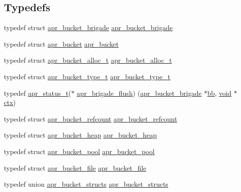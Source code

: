 \subsection*{Typedefs}
\begin{DoxyCompactItemize}
\item 
typedef struct \hyperlink{structapr__bucket__brigade}{apr\+\_\+bucket\+\_\+brigade} \hyperlink{group__APR__Util__Bucket__Brigades_ga9f50254e85c7aad79ca289a0ba069025}{apr\+\_\+bucket\+\_\+brigade}
\item 
typedef struct \hyperlink{structapr__bucket}{apr\+\_\+bucket} \hyperlink{group__APR__Util__Bucket__Brigades_gaa17a456120961b1c5af0525f4900a457}{apr\+\_\+bucket}
\item 
typedef struct \hyperlink{structapr__bucket__alloc__t}{apr\+\_\+bucket\+\_\+alloc\+\_\+t} \hyperlink{group__APR__Util__Bucket__Brigades_ga9a30babfeb6e290db124d8f9b69e49e4}{apr\+\_\+bucket\+\_\+alloc\+\_\+t}
\item 
typedef struct \hyperlink{structapr__bucket__type__t}{apr\+\_\+bucket\+\_\+type\+\_\+t} \hyperlink{group__APR__Util__Bucket__Brigades_ga4a152aaf7d851c81af73b7e84dc1a8a2}{apr\+\_\+bucket\+\_\+type\+\_\+t}
\item 
typedef \hyperlink{group__apr__errno_gaa5105fa83cc322f09382292db8b47593}{apr\+\_\+status\+\_\+t}($\ast$ \hyperlink{group__APR__Util__Bucket__Brigades_gafa0dbcd060e2e432406052e4d7c96204}{apr\+\_\+brigade\+\_\+flush}) (\hyperlink{structapr__bucket__brigade}{apr\+\_\+bucket\+\_\+brigade} $\ast$\hyperlink{group__MOD__PROXY_ga9313a8a2814cff280d5d780c723def3c}{bb}, \hyperlink{group__MOD__ISAPI_gacd6cdbf73df3d9eed42fa493d9b621a6}{void} $\ast$\hyperlink{group__APR__Util__Bucket__Brigades_ga0525238c5b09cb4ac5067ddec654d09c}{ctx})
\item 
typedef struct \hyperlink{structapr__bucket__refcount}{apr\+\_\+bucket\+\_\+refcount} \hyperlink{group__APR__Util__Bucket__Brigades_ga785fd3402961b30315975b0c87c87706}{apr\+\_\+bucket\+\_\+refcount}
\item 
typedef struct \hyperlink{structapr__bucket__heap}{apr\+\_\+bucket\+\_\+heap} \hyperlink{group__APR__Util__Bucket__Brigades_gaede6e77d621d0f3f7d2685d489d01283}{apr\+\_\+bucket\+\_\+heap}
\item 
typedef struct \hyperlink{structapr__bucket__pool}{apr\+\_\+bucket\+\_\+pool} \hyperlink{group__APR__Util__Bucket__Brigades_ga211e00d871029de148116cd24b070aed}{apr\+\_\+bucket\+\_\+pool}
\item 
typedef struct \hyperlink{structapr__bucket__file}{apr\+\_\+bucket\+\_\+file} \hyperlink{group__APR__Util__Bucket__Brigades_ga1a786f7edac4d7a2c212f0fe74457b3d}{apr\+\_\+bucket\+\_\+file}
\item 
typedef union \hyperlink{unionapr__bucket__structs}{apr\+\_\+bucket\+\_\+structs} \hyperlink{group__APR__Util__Bucket__Brigades_ga3c0929c971f94de4521fb0fea6fd3209}{apr\+\_\+bucket\+\_\+structs}
\end{DoxyCompactItemize}
